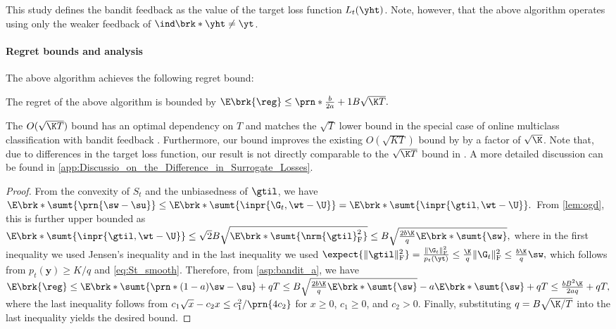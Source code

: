 \begin{remark}\label{rem:zero-loss}
This study defines the bandit feedback as the value of the target loss function $L_t(\yht)$.
Note, however, that the above algorithm operates using only the weaker feedback of $\ind\brk*{\yht\neq\yt}$. 
\end{remark}

\paragraph{Regret bounds and analysis}
The above algorithm achieves the following regret bound:
\begin{theorem}\label{thm:bandit_regret_expectation_abstract}
    The regret of the above algorithm is bounded by
    $
        \E\brk{\reg}\leq \prn*{\frac{b}{2a}+1}B\sqrt{\K T}.
    $
\end{theorem}
The $O(\sqrt{\K T})$ bound has an optimal dependency on $T$  
and matches the $\sqrt{T}$ lower bound in the special case of online multiclass classification with bandit feedback \citep[Corollary 1]{NEURIPS2021_Hoeven}.  
Furthermore, our bound improves the existing $O(\sqrt{KT})$ bound by \citet{NEURIPS2020_Hoeven} by a factor of $\sqrt{\K}$. 
Note that, due to differences in the target loss function, our result is not directly comparable to the $\sqrt{\K T}$ bound in \citet{NEURIPS2021_Hoeven}. A more detailed discussion can be found in \cref{app:Discussio_on_the_Difference_in_Surrogate_Losses}.
\begin{proof}
From the convexity of $S_t$ and the unbiasedness of $\gtil$, we have 
$
    \E\brk*{\sumt{\prn{\sw-\su}}}
    \leq
    \E\brk*{\sumt{\inpr{\G_t,\wt-\U}}}
    =
    \E\brk*{\sumt{\inpr{\gtil,\wt-\U}}}.
 $
From \cref{lem:ogd}, this is further upper bounded as
$
    \E\brk*{\sumt{\inpr{\gtil,\wt-\U}}}
    \leq
    \sqrt{2}B\sqrt{\E\brk*{\sumt{{\nrm{\gtil}_{\mathrm{F}}^2}}}}
    \leq
    B\sqrt{\frac{2b\K }{q}\E\brk*{\sumt{\sw}}},
$
where in the first inequality we used Jensen's inequality and 
in the last inequality we used
$
\expect{\|\gtil\|_{\mathrm{F}}^2}
=
\frac{\|\G_t\|_{\mathrm{F}}^2}{p_t(\yt)}
\leq
\frac{\K }{q}\|\G_t\|_{\mathrm{F}}^2
\leq
\frac{b\K }{q}\sw,
$
which follows from $p_t(\bm{y}) \geq K /q$ and \eqref{eq:St_smooth}.
Therefore, from \cref{asp:bandit_a}, 
we have
$
    \E\brk{\reg}
    \leq
    \E\brk*{\sumt{\prn*{(1-a)\sw-\su}}}+qT
    \leq 
    B\sqrt{\frac{2b\K }{q} \E\brk*{\sumt{\sw}}}-a \E\brk*{\sumt{\sw}}+qT
    \leq
    \frac{bB^2\K }{2aq}+qT
    ,
$
where the last inequality follows from $c_1\sqrt{x}-c_2x\leq{c_1^2}/\prn{4c_2}$ for $x \geq 0$, $c_1\geq 0$, and $c_2>0$.
Finally, substituting $q=B\sqrt{\K/T}$ into the last inequality yields the desired bound.
\end{proof}

